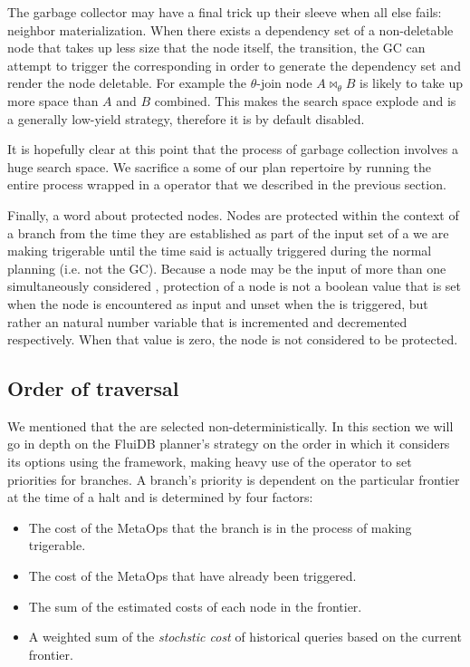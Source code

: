 The garbage collector may have a final trick up their sleeve when all
else fails: neighbor materialization. When there exists a dependency
set of a non-deletable node that takes up less size that the node
itself, the transition, the GC can attempt to trigger the
corresponding  in order to generate the dependency set and
render the node deletable. For example the \(\theta\)-join node \(A
\Join_\theta B\) is likely to take up more space than \(A\) and \(B\)
combined. This makes the search space explode and is a generally
low-yield strategy, therefore it is by default disabled.

It is hopefully clear at this point that the process of garbage
collection involves a huge search space. We sacrifice a some of our
plan repertoire by running the entire process wrapped in a 
operator that we described in the previous section.

Finally, a word about protected nodes. Nodes are protected within the
context of a branch from the time they are established as part of the
input set of a  we are making trigerable until the time said
 is actually triggered during the normal planning (i.e. not
the GC). Because a node may be the input of more than one
simultaneously considered , protection of a node is not a
boolean value that is set when the node is encountered as 
input and unset when the  is triggered, but rather an natural
number variable that is incremented and decremented respectively. When
that value is zero, the node is not considered to be protected.


\subsection{Order of traversal}

We mentioned that the  are selected non-deterministically. In
this section we will go in depth on the FluiDB planner's strategy on
the order in which it considers its options using the 
framework, making heavy use of the  operator to set priorities
for branches. A branch's priority is dependent on the particular
frontier at the time of a halt and is determined by four factors:

\begin{itemize}
\item The cost of the MetaOps that the branch is in the process of making
trigerable.
\item The cost of the MetaOps that have already been triggered.
\item The sum of the estimated costs of each node in the frontier.
\item A weighted sum of the \emph{stochstic cost} of historical queries based
on the current frontier.
\end{itemize}

